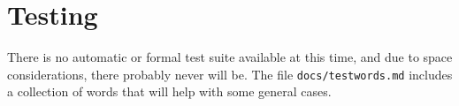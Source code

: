 \section{Testing}

There is no automatic or formal test suite available at this time, and due to
space considerations, there probably never will be. The file
\texttt{docs/testwords.md} includes a collection of words that will help with
some general cases.


